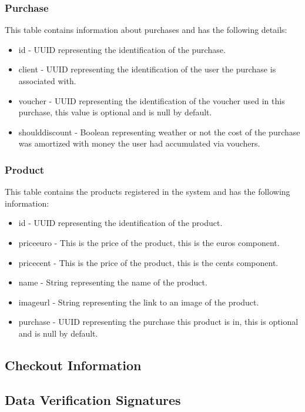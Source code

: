 \documentclass[12pt]{article}
\begin{document}
\subsubsection{Purchase}
\hspace{0.6cm}
This table contains information about purchases and has the following details:
\begin{itemize}
    \item id - UUID representing the identification of the purchase.
	\item client - UUID representing the identification of the user the purchase is associated with.
	\item voucher - UUID representing the identification of the voucher used in this purchase, this value is optional and is null by default.
	\item should\textunderscore discount - Boolean representing weather or not the cost of the purchase was amortized with money the user had accumulated via vouchers.
\end{itemize}


\subsubsection{Product}
\hspace{0.6cm}
This table contains the products registered in the system and has the following information:
\begin{itemize}
    \item id - UUID representing the identification of the product.
	\item price\textunderscore euro - This is the price of the product, this is the euros component.
	\item price\textunderscore cent - This is the price of the product, this is the cents component.
	\item name - String representing the name of the product.
	\item image\textunderscore url - String representing the link to an image of the product.
	\item purchase - UUID representing the purchase this product is in, this is optional and is null by default.
\end{itemize}


\subsection{Checkout Information}

\subsection{Data Verification Signatures}
\end{document}
